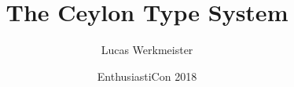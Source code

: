 \documentclass[aspectratio=169]{beamer}
\title{The Ceylon Type System}
\author{Lucas Werkmeister}
\date{EnthusiastiCon 2018}
\begin{document}
\frame{\titlepage}
\end{document}

